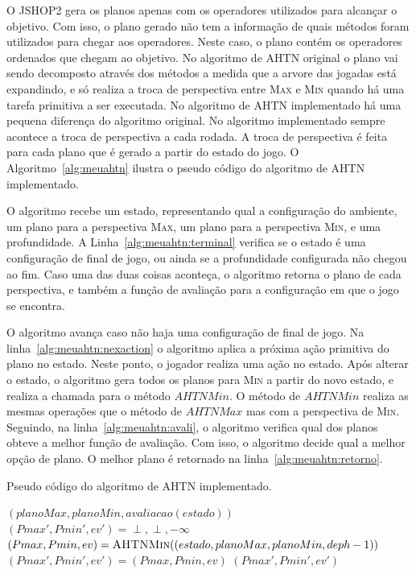O JSHOP2 gera os planos apenas com os operadores utilizados para alcançar o objetivo.
Com isso, o plano gerado não tem a informação de quais métodos foram utilizados para chegar aos operadores.
Neste caso, o plano contém os operadores ordenados que chegam ao objetivo.
No algoritmo de AHTN original o plano vai sendo decomposto através dos métodos a medida que a arvore das jogadas está expandindo, e só realiza a troca de perspectiva entre \textsc{Max} e \textsc{Min} quando há uma tarefa primitiva a ser executada.
No algoritmo de AHTN implementado há uma pequena diferença do algoritmo original.
No algoritmo implementado sempre acontece a troca de perspectiva a cada rodada.
A troca de perspectiva é feita para cada plano que é gerado a partir do estado do jogo.
O Algoritmo~\ref{alg:meuahtn} ilustra o pseudo código do algoritmo de AHTN implementado.

O algoritmo recebe um estado, representando qual a configuração do ambiente, um plano para a perspectiva \textsc{Max}, um plano para a perspectiva \textsc{Min}, e uma profundidade.
A Linha~\ref{alg:meuahtn:terminal} verifica se o estado é uma configuração de final de jogo, ou ainda se a profundidade configurada não chegou ao fim.
Caso uma das duas coisas aconteça, o algoritmo retorna o plano de cada perspectiva, e também a função de avaliação para a configuração em que o jogo se encontra.

O algoritmo avança caso não haja uma configuração de final de jogo.
Na linha~\ref{alg:meuahtn:nexaction} o algoritmo aplica a próxima ação primitiva do plano no estado.
Neste ponto, o jogador realiza uma ação no estado.
Após alterar o estado, o algoritmo gera todos os planos para \textsc{Min} a partir do novo estado, e realiza a chamada para o método $\mathit{AHTNMin}$.
O método de $\mathit{AHTNMin}$ realiza as mesmas operações que o método de $\mathit{AHTNMax}$ mas com a perspectiva de \textsc{Min}.
Seguindo, na linha~\ref{alg:meuahtn:avali}, o algoritmo verifica qual dos planos obteve a melhor função de avaliação. 
Com isso, o algoritmo decide qual a melhor opção de plano.
O melhor plano é retornado na linha~\ref{alg:meuahtn:retorno}.


\begin{algorithm}[ht]
	\caption{Pseudo código do algoritmo de AHTN implementado.}
	\label{alg:meuahtn}
 	\begin{algorithmic}[1]		
	 		 \label{alg:meuahtn:terminal}
		 		\State	\Return $(planoMax, planoMin, avaliacao(estado))$
	 		\EndIf
	 		 \label{alg:meuahtn:nexaction}
	 		\State $(Pmax', Pmin', ev') = \perp, \perp, -\infty$
			 \label{alg:meuahtn:for}
		 		\State $(Pmax, Pmin, ev) = \Call{AHTNMin}{(estado, planoMax, planoMin, deph-1)}$ \label{alg:meuahtn:ahtnmin}
			 	 \label{alg:meuahtn:avali}
					\State $(Pmax', Pmin', ev') = (Pmax, Pmin, ev)$
				\EndIf		 		 		
		 	\EndFor
		 	\State \Return $(Pmax', Pmin', ev')$ \label{alg:meuahtn:retorno}
 		\EndFunction
 	\end{algorithmic}
 \end{algorithm}
 

